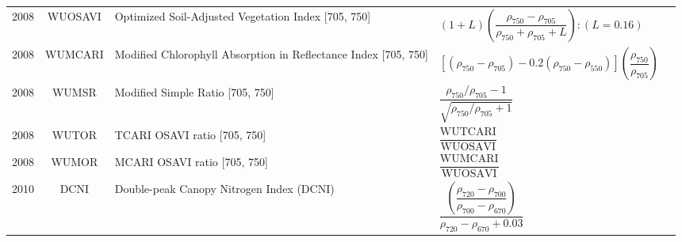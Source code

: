 \documentclass[10pt]{article}
\begin{document}
\begin{ThreePartTable}
\begin{longtable}{c c m{2.80in} M{2.80in} M{1.5in}}
  2008 & WUOSAVI & Optimized Soil-Adjusted Vegetation Index [705, 750]                            & $(1 + L)\left(\dfrac{\rho_{750}-\rho_{705}}{\rho_{750}+\rho_{705}+L}\right):(L=0.16)$                                                                                                                                                                                                   & \citet{Wu2008}                                      \\
  2008 & WUMCARI & Modified Chlorophyll Absorption in Reflectance Index [705, 750]                & $\left[(\rho_{750}-\rho_{705})-0.2(\rho_{750}-\rho_{550})\right]\left(\dfrac{\rho_{750}}{\rho_{705}}\right)$                                                                                                                                                                            & \citet{Wu2008}                                      \\
  2008 & WUMSR   & Modified Simple Ratio [705, 750]                                               & $\dfrac{\rho_{750}/\rho_{705}-1}{\sqrt{\rho_{750}/\rho_{705}+1}}$                                                                                                                                                                                                                       & \citet{Wu2008}                                      \\
  2008 & WUTOR   & TCARI OSAVI ratio [705, 750]                                                   & $\dfrac{\text{WUTCARI}}{\text{WUOSAVI}}$                                                                                                                                                                                                                                                & \citet{Wu2008}                                      \\
  2008 & WUMOR   & MCARI OSAVI ratio [705, 750]                                                   & $\dfrac{\text{WUMCARI}}{\text{WUOSAVI}}$                                                                                                                                                                                                                                                & \citet{Wu2008}                                      \\
  2010 & DCNI    & Double-peak Canopy Nitrogen Index (DCNI)                                       & $\dfrac{\left(\dfrac{\rho_{720}-\rho_{700}}{\rho_{700}-\rho_{670}}\right)}{\rho_{720}-\rho_{670}+0.03}$                                                                                                                                                                                 & \citet{Chen2010}                                    \\

\end{longtable}
\end{ThreePartTable}
\end{document}

